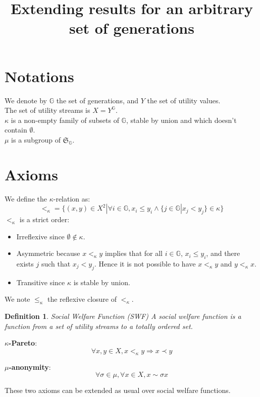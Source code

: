 \documentclass{article}
\title{Extending results for an arbitrary set of generations}
\author{}
\newcommand{\G}{\mathbb{G}}
\newtheorem{definition}{Definition}
\begin{document}
\maketitle

\section{Notations}

We denote by $\G$ the set of generations, and $Y$ the set of utility values.\\
The set of utility streams is $X=Y^\G$.\\
$\kappa$ is a non-empty family of subsets of $\G$, stable by union and which doesn't
contain $\emptyset$.\\
$\mu$ is a subgroup of $\mathfrak{S}_\G$.

\section{Axioms}

We define the $\kappa$-relation as:
\[<_\kappa = \{(x,y)\in X^2|\forall i\in \G, x_i \leq y_i \land
\{j \in \G | x_j < y_j\}\in\kappa\}\]
$<_\kappa$ is a strict order:
\begin{itemize}
  \item Irreflexive since $\emptyset\not\in\kappa$.
  \item Asymmetric because $x<_\kappa y$ implies that for all $i\in\G$,
        $x_i\leq y_i$, and there exists $j$ such that $x_j < y_j$. Hence
        it is not possible to have $x<_\kappa y$ and $y<_\kappa x$.
  \item Transitive since $\kappa$ is stable by union.
\end{itemize}
We note $\leq_\kappa$ the reflexive closure of $<_\kappa$.\smallskip\par

\begin{definition}{Social Welfare Function (SWF)}
  A social welfare function is a function from a set of utility streams
  to a totally ordered set.
\end{definition}

\textbf{$\kappa$-Pareto}:
\[\forall x,y\in X, x <_\kappa y \Rightarrow x \prec y\]

\textbf{$\mu$-anonymity}:
\[\forall\sigma\in\mu,\forall x\in X, x \sim \sigma x\]

These two axioms can be extended as usual over social welfare functions.
\end{document}
